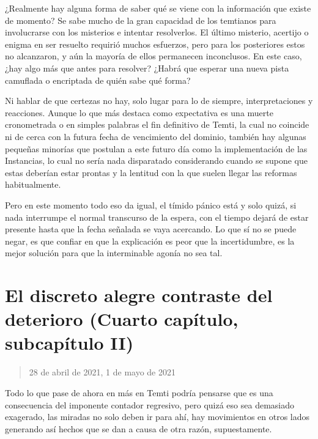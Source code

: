 \documentclass[
  spanish,
]{book}
\begin{document}
¿Realmente hay alguna forma de saber qué se viene con la información que existe de momento? Se sabe mucho de la gran capacidad de los temtianos para involucrarse con los misterios e intentar resolverlos. El último misterio, acertijo o enigma en ser resuelto requirió muchos esfuerzos, pero para los posteriores estos no alcanzaron, y aún la mayoría de ellos permanecen inconclusos. En este caso, ¿hay algo más que antes para resolver? ¿Habrá que esperar una nueva pista camuflada o encriptada de quién sabe qué forma?

Ni hablar de que certezas no hay, solo lugar para lo de siempre, interpretaciones y reacciones. Aunque lo que más destaca como expectativa es una muerte cronometrada o en simples palabras el fin definitivo de Temti, la cual no coincide ni de cerca con la futura fecha de vencimiento del dominio, también hay algunas pequeñas minorías que postulan a este futuro día como la implementación de las Instancias, lo cual no sería nada disparatado considerando cuando se supone que estas deberían estar prontas y la lentitud con la que suelen llegar las reformas habitualmente.

Pero en este momento todo eso da igual, el tímido pánico está y solo quizá, si nada interrumpe el normal transcurso de la espera, con el tiempo dejará de estar presente hasta que la fecha señalada se vaya acercando. Lo que sí no se puede negar, es que confiar en que la explicación es peor que la incertidumbre, es la mejor solución para que la interminable agonía no sea tal.

\hypertarget{el-discreto-alegre-contraste-del-deterioro-cuarto-capuxedtulo-subcapuxedtulo-ii}{%
\section{El discreto alegre contraste del deterioro (Cuarto capítulo, subcapítulo II)}\label{el-discreto-alegre-contraste-del-deterioro-cuarto-capuxedtulo-subcapuxedtulo-ii}}

\begin{quote}
28 de abril de 2021, 1 de mayo de 2021
\end{quote}

Todo lo que pase de ahora en más en Temti podría pensarse que es una consecuencia del imponente contador regresivo, pero quizá eso sea demasiado exagerado, las miradas no solo deben ir para ahí, hay movimientos en otros lados generando así hechos que se dan a causa de otra razón, supuestamente.
\end{document}
